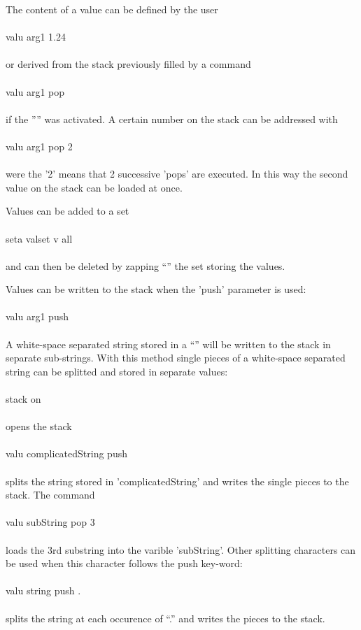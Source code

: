 \documentclass{article}
\begin{document}
The content of a value can be defined by the user\\\\valu arg1 1.24\\\\or derived from the stack previously filled by a command\\\\valu arg1 pop\\\\if the '''' was activated. A certain number on the stack can be addressed with\\\\valu arg1 pop 2\\\\were the '2' means that 2 successive 'pops' are executed. In this way the second value on the stack can be loaded at once.

Values can be added to a set\\\\ seta valset v all\\\\and can then be deleted by zapping ``'' the set storing the values.

Values can be written to the stack when the 'push' parameter is used:\\\\valu arg1 push\\\\A white-space separated string stored in a ``'' will be written to the stack in separate sub-strings. With this method single pieces of a white-space separated string can be splitted and stored in separate values:\\\\stack on\\\\opens the stack\\\\valu complicatedString push\\\\splits the string stored in 'complicatedString' and writes the single pieces to the stack. The command \\\\valu subString pop 3\\\\loads the 3rd substring into the varible 'subString'. Other splitting characters can be used when this character follows the push key-word:\\\\valu string push .\\\\splits the string at each occurence of ``.'' and writes the pieces to the stack. 
\end{document}
